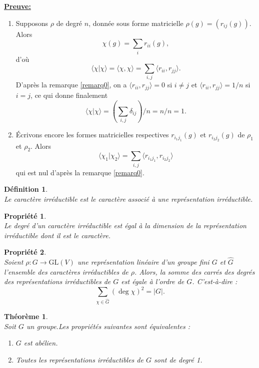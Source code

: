 \documentclass[a4paper, 14pt]{report}
\newtheorem{definition}{Définition}[section]
\newtheorem{propriety}{Propriété}[section]
\newtheorem{theorem}{Théorème}[section]
\begin{document}
\begin{onehalfspace}
{\textbf{\underline{Preuve:}}
\begin{enumerate} [label=\roman*)]
	\item Supposons \( \rho \) de degré \( n \), donnée sous forme matricielle \( \rho(g) = (r_{ij}(g)) \). Alors 
	\[
	\chi(g) = \sum_i r_{ii}(g),
	\]
	d'où 
	\[
	\langle \chi | \chi \rangle = \langle \chi, \chi \rangle = \sum_{i,j} \langle r_{ii}, r_{jj} \rangle.
	\]
D'après la remarque \ref{remarq0}, on a \( \langle r_{ii}, r_{jj} \rangle = 0 \) si \( i \neq j \) et \( \langle r_{ii}, r_{jj} \rangle = 1/n \) si \( i = j \), ce qui donne finalement 
	\[
	\langle \chi | \chi \rangle = \left( \sum_{i,j} \delta_{ij} \right) / n = n / n = 1.
	\]
	
	\item Écrivons encore les formes matricielles respectives \( r_{i_1 j_1}(g) \) et \( r_{i_2 j_2}(g) \)
	 de \( \rho_1 \) et \( \rho_2 \). Alors 
	\[
	\langle \chi_1 | \chi_2 \rangle = \sum_{i,j} \langle r_{i_1 j_1}, r_{i_2 j_2} \rangle
	\]
	qui est nul d'après la remarque \ref{remarq0}.
\end{enumerate}

\begin{definition} \cite{renard2009groupes} \\
Le caractère irréductible est  le caractère associé à une représentation irréductible.
\end{definition}

\begin{propriety}\cite{renard2009groupes} \\
Le degré d’un caractère irréductible est égal à la dimension de la représentation irréductible dont il est le caractère.
\end{propriety}

\begin{propriety} \cite{renard2009groupes} \label{propr0}\\	
Soient \( \rho : G \rightarrow \mathrm{GL}(V) \) une représentation linéaire 
d'un groupe fini  \( G \) et \( \widehat{G} \) l'ensemble des caractères irréductibles de \( \rho \).  
Alors, la somme des carrés des degrés des représentations irréductibles de \( G \) est égale à l'ordre de \( G \). C'est-à-dire :
	\[
	\sum_{\chi \in \widehat{G}} (\deg \chi)^2 = |G|.
	\]
\end{propriety}


\begin{theorem}  \cite{serre1971representation} \\
	Soit  \( G \) un groupe.Les propriétés suivantes sont équivalentes :
	\begin{enumerate}
		\item[(i)] \( G \) est abélien.
		\item[(ii)] Toutes les représentations irréductibles de \( G \) sont de degré 1.
	\end{enumerate}
\end{theorem}

}
\end{onehalfspace}
\end{document}
